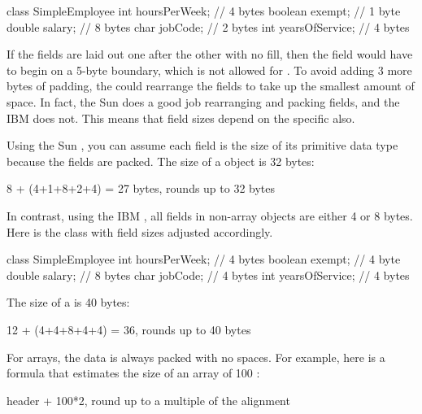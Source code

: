 \begin{shortlisting}
class SimpleEmployee {
    int hoursPerWeek;     // 4 bytes       
    boolean exempt;       // 1 byte          
    double salary;        // 8 bytes          
    char jobCode;         // 2 bytes           
    int yearsOfService;   // 4 bytes      	
}
\end{shortlisting}

If the fields are laid out one after the other with no fill, then the field  would have to begin on a 5-byte boundary, which is not allowed for . To avoid adding 3 more bytes of padding, the \jre could rearrange the fields to take up the smallest amount of space. In fact, the Sun  \jre does a good job rearranging and packing fields, and the IBM \jre does not. This means that field sizes depend on the specific \jre also. 

Using the Sun \jre, you can assume each field is the size of its primitive data type because the fields are packed. The size of a
 object is 32 bytes:

\begin{shortlisting}               
8 + (4+1+8+2+4) = 27 bytes, rounds up to 32 bytes
\end{shortlisting} 

In contrast, using the IBM \jre, all fields in non-array objects are either 4 or
8 bytes. Here is the  class with field sizes adjusted
accordingly.
\begin{shortlisting} 
class SimpleEmployee {
    int hoursPerWeek;        // 4 bytes
    boolean exempt;          // 4 byte
    double salary;           // 8 bytes
    char jobCode;            // 4 bytes
    int yearsOfService;      // 4 bytes
}
\end{shortlisting}
The size of a  is 40 bytes:
\begin{shortlisting}
12 + (4+4+8+4+4) = 36, rounds up to 40 bytes
\end{shortlisting}

For arrays, the data is always packed with no spaces. For example, here is a
formula that estimates the size of an array of 100 :
\begin{shortlisting}
header + 100*2, round up to a multiple of the alignment
\end{shortlisting}



